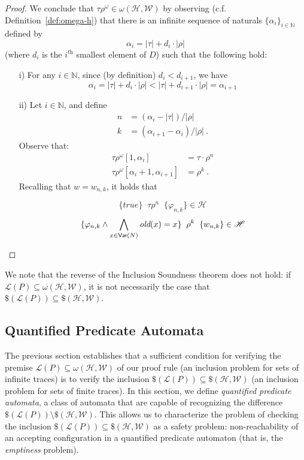 \documentclass[9pt,nocopyrightspace]{sigplanconf}
\theoremstyle{definition}
\newcommand{\true}{\textit{true}}
\newcommand{\hoare}[3]{\{{#1}\}\;\;#2\;\;\{{#3}\}}
\newcommand{\rankformula}{w}
\newcommand{\rankformulas}{\mathscr{W}}
\newcommand{\lang}{\mathcal{L}}
\renewcommand{\phi}{\varphi}
\newcommand{\old}[1]{\textit{old}(#1)}
\newcommand{\ftrace}{finite trace}
\newcommand{\itrace}{infinite trace}
\newcommand{\iVar}[1]{\textsf{Var}(#1)}
\begin{document}
\begin{proof}
  We conclude that $\tau\rho^\omega \in \omega(\mathscr{H},\rankformulas)$ by observing
  (c.f. Definition~\ref{def:omega-h}) that there is an infinite sequence of
  naturals $\{\alpha_i\}_{i \in \mathbb{N}}$ defined by
  \[\alpha_i = |\tau| + d_i\cdot|\rho|\]
  (where $d_i$ is the $i^{\textit{th}}$ smallest element of $D$) such that the following hold:
  \begin{enumerate}
  \item[i)] For any $i \in \mathbb{N}$, since (by definition) $d_i<d_{i+1}$,
    we have
    \[ \alpha_i = |\tau|+d_i\cdot|\rho| < |\tau|+d_{i+1}\cdot|\rho| = \alpha_{i+1} \]
  \item[ii)] Let $i \in \mathbb{N}$, and define
    \begin{align*}
      n &= (\alpha_i - |\tau|)/|\rho|\\
      k &= (\alpha_{i+1} - \alpha_i)/|\rho|\ .
    \end{align*}
    Observe that:
    \begin{align*}
      \tau\rho^\omega[1,\alpha_i] &= \tau \cdot \rho^n\\
      \tau\rho^\omega[\alpha_i+1,\alpha_{i+1}] &= \rho^k\ .
    \end{align*}
    Recalling that
    $\rankformula = \rankformula_{n,k}$, it holds that

  \[\hoare{\true}{\tau\rho^n}{\phi_{n,k}} \in \mathscr{H}\]
  \[\hoare{\phi_{n,k} \land \bigwedge_{x \in \iVar{N}} \old{x} = x}{\rho^k}{\rankformula_{n,k}} \in \mathscr{H} \qedhere\]
  \end{enumerate}
\end{proof}

\begin{remark}
  We note that the reverse of the Inclusion Soundness theorem does not hold:
  if $\lang(P) \subseteq \omega(\mathscr{H},\rankformulas)$, it is not necessarily the
  case that $\$(\lang(P)) \subseteq \$(\mathscr{H},\rankformulas)$.
\end{remark}



\subsection{Quantified Predicate Automata}

The previous section establishes that a sufficient condition for verifying the
premise $\lang(P) \subseteq \omega(\mathscr{H},\rankformulas)$ of our proof
rule (an inclusion problem for sets of \itrace{}s) is to verify the inclusion
$\$(\lang(P)) \subseteq \$(\mathscr{H},\rankformulas)$ (an inclusion problem
for sets of \ftrace{}s).  In this section, we define \emph{quantified
  predicate automata}, a class of automata that are capable of recognizing the
difference $\$(\lang(P)) \setminus \$(\mathscr{H},\rankformulas)$.  This
allows us to characterize the problem of checking the inclusion $\$(\lang(P))
\subseteq \$(\mathscr{H},\rankformulas)$ as a safety problem: non-reachability
of an accepting configuration in a quantified predicate automaton (that is, the
\emph{emptiness} problem).
\end{document}
